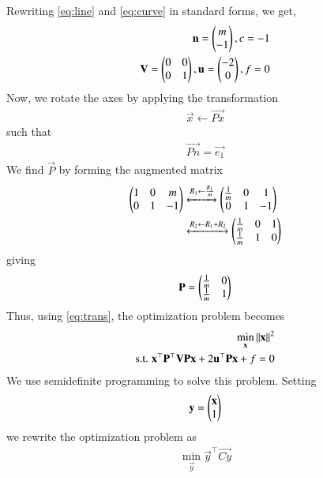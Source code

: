 \documentclass[journal,12pt,twocolumn]{IEEEtran}
\begin{document}
\begin{enumerate}
    \solution Rewriting \eqref{eq:line} and \eqref{eq:curve} in standard forms,
    we get,
    \begin{align}
        \mathbf{n} = \begin{pmatrix}m\\-1\end{pmatrix}, c = -1 \label{eq:line-params} \\
        \mathbf{V} = \begin{pmatrix}0&0\\0&1\end{pmatrix}, \mathbf{u} = \begin{pmatrix}-2\\0\end{pmatrix}, f = 0 \label{eq:curve-params}
    \end{align}
    Now, we rotate the axes by applying the transformation
    \begin{align}
        \vec{x} \leftarrow \vec{Px}
        \label{eq:trans}
    \end{align}
    such that
    \begin{align}
        \vec{Pn} = \vec{e_1} \label{eq:n-e1}
    \end{align}
    We find $\vec{P}$ by forming the augmented matrix
    \begin{align}
        \begin{pmatrix}1&0&m\\0&1&-1\end{pmatrix} &\xleftrightarrow[]{R_1 \leftarrow \frac{R_1}{m}} \begin{pmatrix}\frac{1}{m}&0&1\\0&1&-1\end{pmatrix} \\
                &\xleftrightarrow[]{R_2 \leftarrow R_1 + R_2} \begin{pmatrix}\frac{1}{m}&0&1\\\frac{1}{m}&1&0\end{pmatrix}
                \label{eq:aug-P}
    \end{align}
    giving
    \begin{align}
        \mathbf{P} = \begin{pmatrix}\frac{1}{m}&0\\\frac{1}{m}&1\end{pmatrix}
        \label{eq:P-val}
    \end{align}
    Thus, using \eqref{eq:trans}, the optimization problem becomes
    \begin{align}
        \min_{\mathbf{x}} \left\lVert\mathbf{x}\right\rVert^2 \label{eq:cost} \\
        \textrm{s.t. } \mathbf{x}^\top\mathbf{P}^\top\mathbf{VPx} + 2\mathbf{u}^\top\mathbf{Px} + f = 0 \label{eq:constr}
    \end{align}
    We use semidefinite programming to solve this problem. Setting
    \begin{align}
        \mathbf{y} = \begin{pmatrix}\mathbf{x}\\1\end{pmatrix}
    \end{align}
    we rewrite the optimization problem as
    \begin{align}
        \min_{\vec{y}}\vec{y}^\top\vec{Cy} \label{eq:y-cost} \\

\end{align}
\end{enumerate}
\end{document}
